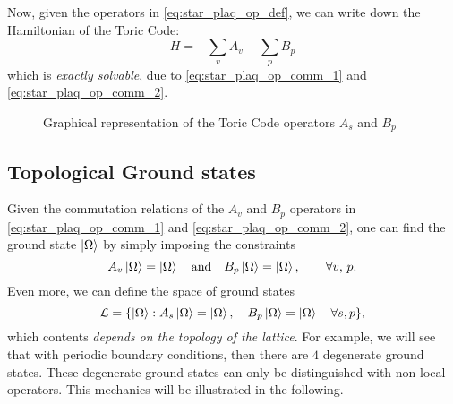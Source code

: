 Now, given the operators in \eqref{eq:star_plaq_op_def}, we can write down the Hamiltonian of the Toric Code:
\begin{equation}
    H = - \sum_{v} A_v - \sum_{p} B_p
    \label{eq:toric_code_hamiltonian}
\end{equation}
which is \emph{exactly solvable}, due to \eqref{eq:star_plaq_op_comm_1} and \eqref{eq:star_plaq_op_comm_2}.
\begin{figure}[t]
    \centering
    
    \caption{Graphical representation of the Toric Code operators $A_s$ and $B_p$}
    \label{fig:toric_code_operators}
\end{figure}



%
%
\subsection{Topological Ground states}
\label{sub:topological_ground_states}

Given the commutation relations of the $A_v$ and $B_p$ operators in \eqref{eq:star_plaq_op_comm_1} and \eqref{eq:star_plaq_op_comm_2}, one can find the ground state $\ket{\Omega}$ by simply imposing the constraints
\begin{equation}
    A_v \ket{\Omega} = \ket{\Omega} \qand
    B_p \ket{\Omega} = \ket{\Omega}, \qquad \forall v,\, p.
    \label{eq:ground_state_constraints}
\end{equation}
Even more, we can define the space of ground states
\begin{equation}
    \mathcal{L} = \qty{ \ket{\Omega} : A_s \ket{\Omega} = \ket{\Omega}, \quad B_p \ket{\Omega} = \ket{\Omega} \quad \forall s, p },
\end{equation}
which contents \emph{depends on the topology of the lattice}.
For example, we will see that with periodic boundary conditions, then there are $4$ degenerate ground states.
These degenerate ground states can only be distinguished with non-local operators.
This mechanics will be illustrated in the following.


